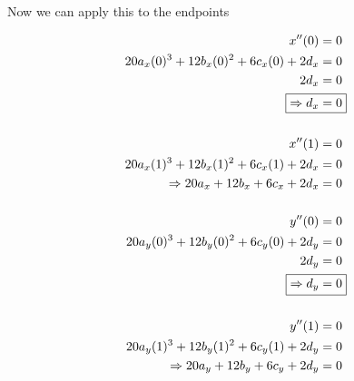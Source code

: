 \documentclass[12pt, letterpaper]{article}
\begin{document}
\newpage
Now we can apply this to the endpoints

\begin{align}
x''(0) &= 0 \nonumber \\
20a_x(0)^3 + 12b_x(0)^2 + 6c_x(0) + 2d_x &= 0 \nonumber \\
2d_x &= 0 \nonumber \\
\Aboxed{\Rightarrow d_x &= 0} \\
\nonumber \\
x''(1) &= 0 \nonumber \\
20a_x(1)^3 + 12b_x(1)^2 + 6c_x(1) + 2d_x &= 0 \nonumber \\
\Rightarrow 20a_x + 12b_x + 6c_x + 2d_x &= 0 \\
\nonumber \\
y''(0) &= 0 \nonumber \\
20a_y(0)^3 + 12b_y(0)^2 + 6c_y(0) + 2d_y &= 0 \nonumber \\
2d_y &= 0 \nonumber \\
\Aboxed{\Rightarrow d_y &= 0} \\
\nonumber \\
y''(1) &= 0 \nonumber \\
20a_y(1)^3 + 12b_y(1)^2 + 6c_y(1) + 2d_y &= 0 \nonumber \\
\Rightarrow 20a_y + 12b_y + 6c_y + 2d_y &= 0 
\end{align}
\end{document}
